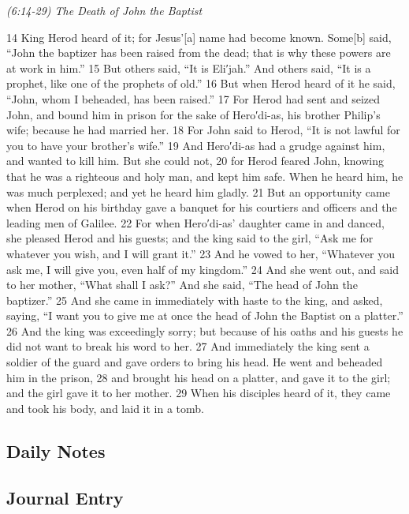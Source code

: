 \documentclass[letterpaper]{report}
\begin{document}
{\centering
	\emph{(6:14-29) The Death of John the Baptist}\\
}
\begin{multicols}{2}
14 King Herod heard of it; for Jesus’[a] name had become known. Some[b] said, “John the baptizer has been raised from the dead; that is why these powers are at work in him.” 15 But others said, “It is Eli′jah.” And others said, “It is a prophet, like one of the prophets of old.” 16 But when Herod heard of it he said, “John, whom I beheaded, has been raised.” 17 For Herod had sent and seized John, and bound him in prison for the sake of Hero′di-as, his brother Philip’s wife; because he had married her. 18 For John said to Herod, “It is not lawful for you to have your brother’s wife.” 19 And Hero′di-as had a grudge against him, and wanted to kill him. But she could not, 20 for Herod feared John, knowing that he was a righteous and holy man, and kept him safe. When he heard him, he was much perplexed; and yet he heard him gladly. 21 But an opportunity came when Herod on his birthday gave a banquet for his courtiers and officers and the leading men of Galilee. 22 For when Hero′di-as’ daughter came in and danced, she pleased Herod and his guests; and the king said to the girl, “Ask me for whatever you wish, and I will grant it.” 23 And he vowed to her, “Whatever you ask me, I will give you, even half of my kingdom.” 24 And she went out, and said to her mother, “What shall I ask?” And she said, “The head of John the baptizer.” 25 And she came in immediately with haste to the king, and asked, saying, “I want you to give me at once the head of John the Baptist on a platter.” 26 And the king was exceedingly sorry; but because of his oaths and his guests he did not want to break his word to her. 27 And immediately the king sent a soldier of the guard and gave orders to bring his head. He went and beheaded him in the prison, 28 and brought his head on a platter, and gave it to the girl; and the girl gave it to her mother. 29 When his disciples heard of it, they came and took his body, and laid it in a tomb.
\end{multicols}

\clearpage
\subsection{Daily Notes}

\clearpage
\subsection{Journal Entry}
\end{document}
